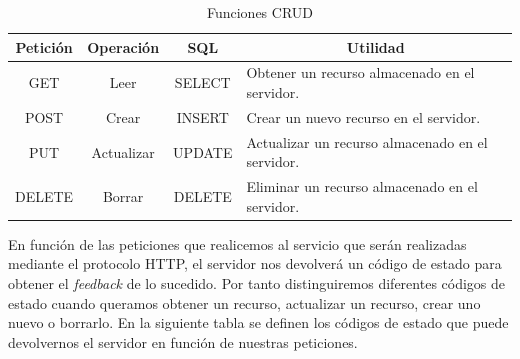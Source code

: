 \begin{table}[H]
\begin{tabular}{|c|c|c|m{6.25cm}|}
\hline
{\bf Petición} & {\bf Operación} & {\bf SQL} & \multicolumn{1}{c|}{{\bf Utilidad}}              \\ \hline
GET            & Leer            & SELECT    & Obtener un recurso almacenado en el servidor.    \\ \hline
POST           & Crear           & INSERT    & Crear un nuevo recurso en el servidor.           \\ \hline
PUT            & Actualizar      & UPDATE    & Actualizar un recurso almacenado en el servidor. \\ \hline
DELETE         & Borrar          & DELETE    & Eliminar un recurso almacenado en el servidor.   \\ \hline
\end{tabular}
\caption{Funciones CRUD}
\label{fig:CRUDtable}
\end{table}

En función de las peticiones que realicemos al servicio que serán realizadas mediante el protocolo HTTP, el servidor nos devolverá un código de estado para obtener el \textit{feedback} de lo sucedido. Por tanto distinguiremos diferentes códigos de estado cuando queramos obtener un recurso, actualizar un recurso, crear uno nuevo o borrarlo. En la siguiente tabla se definen los códigos de estado que puede devolvernos el servidor en función de nuestras peticiones.

